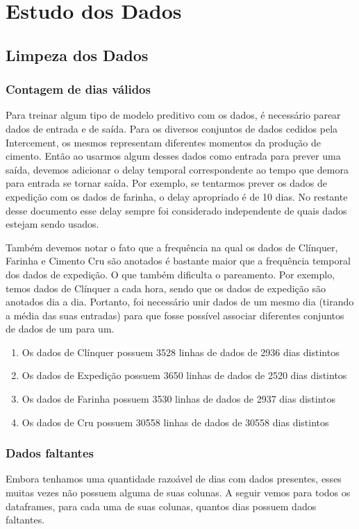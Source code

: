 
\chapter{Estudo dos Dados}
\label{cap:estudodados}


\section{Limpeza dos Dados}

\subsection{Contagem de dias válidos}

Para treinar algum tipo de modelo preditivo com os dados, é necessário parear dados de entrada e de saída. Para os diversos conjuntos de dados cedidos pela Intercement, os mesmos representam diferentes momentos da produção de cimento. Então ao usarmos algum desses dados como entrada para prever uma saída, devemos adicionar o delay temporal correspondente ao tempo que demora para entrada se tornar saída. Por exemplo, se tentarmos prever os dados de expedição com os dados de farinha, o delay apropriado é de 10 dias. No restante desse documento esse delay sempre foi considerado independente de quais dados estejam sendo usados.

Também devemos notar o fato que a frequência na qual os dados de Clínquer, Farinha e Cimento Cru são anotados é bastante maior que a frequência temporal dos dados de expedição. O que também dificulta o pareamento. Por exemplo, temos dados de Clínquer a cada hora, sendo que os dados de expedição são anotados dia a dia. Portanto, foi necessário unir dados de um mesmo dia (tirando a média das suas entradas) para que fosse possível associar diferentes conjuntos de dados de um para um.
\begin{enumerate}
    \item Os dados de  Clínquer possuem 3528 linhas de dados de 2936 dias distintos
\item Os dados de  Expedição possuem 3650 linhas de dados de 2520 dias distintos
\item Os dados de  Farinha possuem 3530 linhas de dados de 2937 dias distintos
\item Os dados de  Cru possuem 30558 linhas de dados de 30558 dias distintos
\end{enumerate}

\subsection{Dados faltantes}
Embora tenhamos uma quantidade razoável de dias com dados presentes, esses muitas vezes não possuem alguma de suas colunas.
A seguir vemos para todos os dataframes, para cada uma de suas colunas, quantos dias possuem dados faltantes.



